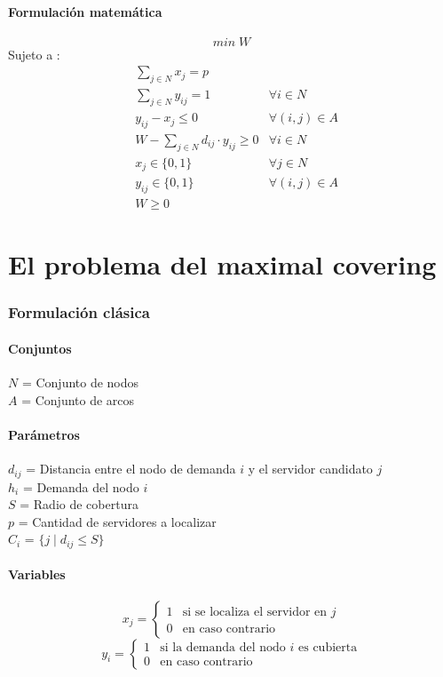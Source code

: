 \documentclass{article}
\numberwithin{equation}{section}
\begin{document}
\subsection{Formulación matemática}
\begin{equation}
min \; W
\end{equation}
Sujeto a : \begin{align}
& \sum_{j \in N} x_{j} = p \\
& \sum_{j \in N} y_{ij} = 1 &\forall i \in N \\
& y_{ij} - x_{j} \leq 0 &\forall (i,j) \in A \\
& W - \sum_{j \in N} d_{ij} \cdot y_{ij} \geq 0 &\forall i \in N\\
& x_{j} \in \{0,1\} &\forall j \in N\\
& y_{ij} \in \{0,1\} &\forall (i,j) \in A\\
& W \geq 0
\end{align}



\newpage
\part{El problema del maximal covering}
\section{Formulación clásica}
\subsection{Conjuntos}
$N$ = Conjunto de nodos\\
$A$ = Conjunto de arcos
\subsection{Parámetros}
$d_{ij}$ = Distancia entre el nodo de demanda $i$ y el servidor candidato $j$\\
$h_{i}$ = Demanda del nodo $i$\\
$S$ = Radio de cobertura\\
$p$ = Cantidad de servidores a localizar\\
$C_{i}$ = $\{j \mid d_{ij} \leq S\}$
\subsection{Variables}
\begin{flushleft}
\[x_{j}={\begin{cases}1&{\mbox{si se localiza el servidor en $j$}}\\0&{\mbox{en caso contrario}}\end{cases}}
\]
\[y_{i}={\begin{cases}1&{\mbox{si la demanda del nodo $i$ es cubierta}}\\0&{\mbox{en caso contrario}}\end{cases}}
\]
\end{flushleft}
\end{document}
